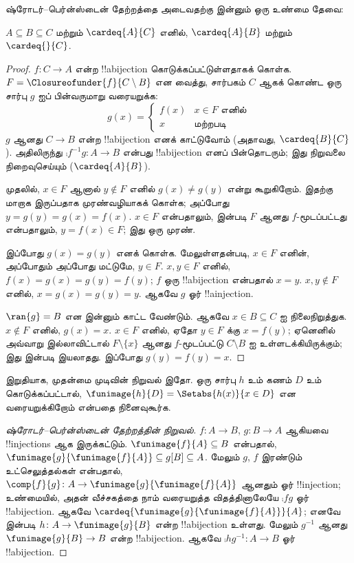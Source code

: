 \documentclass[../../../include/open-logic-section]{subfiles}
\begin{document}
ஷ்ரோடர்--பெர்ன்ஸ்டைன் தேற்றத்தை அடைவதற்கு இன்னும் ஒரு உண்மை தேவை:

\begin{prop}
$A \subseteq B \subseteq C$ மற்றும் $\cardeq{A}{C}$ எனில்,
$\cardeq{A}{B}$ மற்றும்~$\cardeq{}{C}$.
\end{prop}

\begin{proof}
$f \colon C \to A$ என்ற !!a{bijection} கொடுக்கப்பட்டுள்ளதாகக் கொள்க.
$F = \Closureofunder{f}{C \setminus B}$ என வைத்து, சார்பகம் $C$ ஆகக்
கொண்ட ஒரு சார்பு $g$ ஐப் பின்வருமாறு வரையறுக்க:
\[
	g(x) =
	\begin{cases}
			f(x) &\text{$x \in F$ எனில்}\\
			x & \text{மற்றபடி}
	\end{cases}
\]
$g$ ஆனது $C \to B$ என்ற !!a{bijection} எனக் காட்டுவோம் (அதாவது,
$\cardeq{B}{C}$).
அதிலிருந்து $\comp{f^{-1}}{g} \colon A \to B$ என்பது
!!a{bijection} எனப் பின்தொடரும்; இது நிறுவலை நிறைவுசெய்யும் ($\cardeq{A}{B}$).

முதலில், $x \in F$ ஆனால் $y\notin F$ எனில் $g(x) \neq g(y)$ என்று
கூறுகிறோம். இதற்கு மாறாக இருப்பதாக முரண்வழியாகக் கொள்க; அப்போது
$y = g(y) = g(x) = f(x)$. $x \in F$ என்பதாலும்,
 இன்படி $F$ ஆனது $f$-மூடப்பட்டது என்பதாலும்,
$y = f(x) \in F$; இது ஒரு முரண்.

இப்போது $g(x) = g(y)$ எனக் கொள்க. மேலுள்ளதன்படி,
$x \in F$ எனின், அப்போதும் அப்போது மட்டுமே, $y \in F$.
$x, y \in F$ எனில், $f(x) = g (x) = g(y) = f(y)$;
$f$ ஒரு !!a{bijection} என்பதால் $x = y$.
$x, y \notin F$ எனில், $x = g(x) = g(y) = y$.
ஆகவே $g$ ஓர் !!a{injection}.

$\ran{g} = B$ என இன்னும் காட்ட வேண்டும். ஆகவே
$x \in B \subseteq C$ ஐ நிலைநிறுத்துக. $x \notin F$ எனில்,
$g(x) = x$. $x \in F$ எனில், ஏதோ $y \in F$ க்கு $x = f(y)$;
ஏனெனில் அவ்வாறு இல்லாவிட்டால் $F \setminus \{x\}$ ஆனது
$f$-மூடப்பட்டு $C\setminus B$ ஐ உள்ளடக்கியிருக்கும்; இது
 இன்படி இயலாதது. இப்போது $g(y) = f(y) = x$.
\end{proof}

இறுதியாக, முதன்மை முடிவின் நிறுவல் இதோ. ஒரு சார்பு $h$ உம் கணம்
$D$ உம் கொடுக்கப்பட்டால், $\funimage{h}{D} = \Setabs{h(x)}{x
\in D}$ என வரையறுக்கிறோம் என்பதை நினைவுகூர்க.

\begin{proof}[ஷ்ரோடர்--பெர்ன்ஸ்டைன் தேற்றத்தின் நிறுவல்]
$f \colon A \to B$, $g \colon B \to A$ ஆகியவை !!{injection}s
ஆக இருக்கட்டும். $\funimage{f}{A} \subseteq B$ என்பதால்,
$\funimage{g}{\funimage{f}{A}} \subseteq g[B] \subseteq A$.
மேலும் $g$, $f$ இரண்டும் உட்செலுத்தல்கள் என்பதால்,
$\comp{f}{g} \colon A \to \funimage{g}{\funimage{f}{A}}$ ஆனதும்
ஓர் !!{injection}; உண்மையில், அதன் வீச்சகத்தை நாம் வரையறுத்த
விதத்தினாலேயே $\comp{f}{g}$ ஓர் !!a{bijection}.
ஆகவே $\cardeq{\funimage{g}{\funimage{f}{A}}}{A}$;
எனவே  இன்படி $h \colon A \to \funimage{g}{B}$ என்ற
!!a{bijection} உள்ளது. மேலும் $g^{-1}$ ஆனது
$\funimage{g}{B} \to B$ என்ற !!a{bijection}.
ஆகவே $\comp{h}{g^{-1}} \colon A \to B$ ஓர் !!a{bijection}.
\end{proof}
\end{document}

